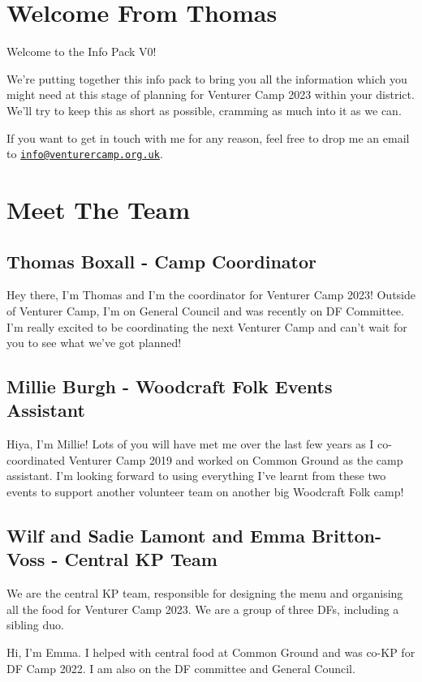 \documentclass[a4paper, 10pt]{report}
\begin{document}
\tableofcontents

\chapter{Welcome From Thomas}
Welcome to the Info Pack V0!

We're putting together this info pack to bring you all the information which you might need at this stage of planning for Venturer Camp 2023 within your district.
We'll try to keep this as short as possible, cramming as much into it as we can.

If you want to get in touch with me for any reason, feel free to drop me an email to \href{mailto:info@venturercamp.orf.uk}{\texttt{info@venturercamp.org.uk}}. 

\chapter{Meet The Team}
\section{Thomas Boxall - Camp Coordinator}
Hey there, I'm Thomas and I'm the coordinator for Venturer Camp 2023! Outside of Venturer Camp, I'm on General Council and was recently on DF Committee. I'm really excited to be coordinating the next Venturer Camp and can't wait for you to see what we've got planned!
\section{Millie Burgh - Woodcraft Folk Events Assistant}
Hiya, I'm Millie! Lots of you will have met me over the last few years as I co-coordinated Venturer Camp 2019 and worked on Common Ground as the camp assistant. I'm looking forward to using everything I've learnt from these two events to support another volunteer team on another big Woodcraft Folk camp!
\section{Wilf and Sadie Lamont and Emma Britton-Voss - Central KP Team}
We are the central KP team, responsible for designing the menu and organising all the food for Venturer Camp 2023. We are a group of three DFs, including a sibling duo.

Hi, I'm Emma. I helped with central food at Common Ground and was co-KP for DF Camp 2022. I am also on the DF committee and General Council.
\end{document}
